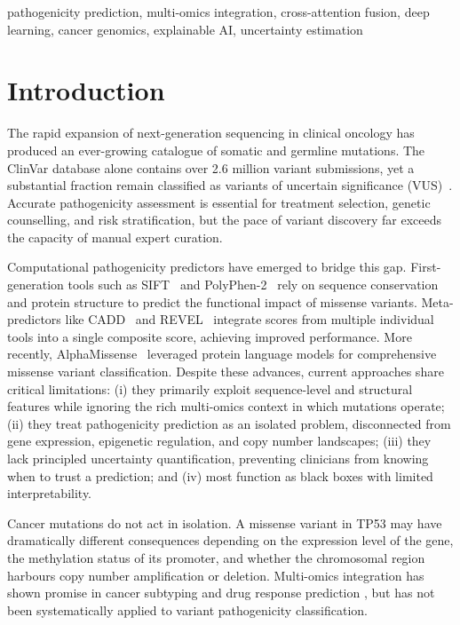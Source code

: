 \documentclass[journal,twoside]{IEEEtran}
\begin{document}
\begin{IEEEkeywords}
pathogenicity prediction, multi-omics integration, cross-attention fusion,
deep learning, cancer genomics, explainable AI, uncertainty estimation
\end{IEEEkeywords}

\section{Introduction}

The rapid expansion of next-generation sequencing in clinical oncology has
produced an ever-growing catalogue of somatic and germline mutations. The
ClinVar database alone contains over 2.6 million variant submissions, yet a
substantial fraction remain classified as variants of uncertain significance
(VUS)~\cite{landrum2020clinvar}. Accurate pathogenicity assessment is
essential for treatment selection, genetic counselling, and risk stratification,
but the pace of variant discovery far exceeds the capacity of manual expert
curation.

Computational pathogenicity predictors have emerged to bridge this gap.
First-generation tools such as SIFT~\cite{kumar2009sift} and
PolyPhen-2~\cite{adzhubei2010polyphen2} rely on sequence conservation and
protein structure to predict the functional impact of missense variants.
Meta-predictors like CADD~\cite{rentzsch2019cadd} and REVEL~\cite{ioannidis2016revel}
integrate scores from multiple individual tools into a single composite score,
achieving improved performance. More recently, AlphaMissense~\cite{cheng2023alphamissense}
leveraged protein language models for comprehensive missense variant
classification. Despite these advances, current approaches share critical
limitations: (i) they primarily exploit sequence-level and structural features
while ignoring the rich multi-omics context in which mutations operate;
(ii) they treat pathogenicity prediction as an isolated problem, disconnected
from gene expression, epigenetic regulation, and copy number landscapes;
(iii) they lack principled uncertainty quantification, preventing clinicians
from knowing when to trust a prediction; and (iv) most function as black
boxes with limited interpretability.

Cancer mutations do not act in isolation. A missense variant in TP53 may have
dramatically different consequences depending on the expression level of the
gene, the methylation status of its promoter, and whether the chromosomal
region harbours copy number amplification or deletion. Multi-omics integration
has shown promise in cancer subtyping and drug response prediction
\cite{cheerla2019multimodal, wang2021mogonet}, but has not been systematically
applied to variant pathogenicity classification.
\end{document}
